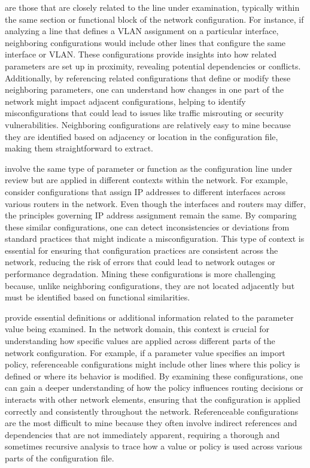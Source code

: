      are those that are closely related to the line under examination, typically within the same section or functional block of the network configuration. For instance, if analyzing a line that defines a VLAN assignment on a particular interface, neighboring configurations would include other lines that configure the same interface or VLAN. These configurations provide insights into how related parameters are set up in proximity, revealing potential dependencies or conflicts. Additionally, by referencing related configurations that define or modify these neighboring parameters, one can understand how changes in one part of the network might impact adjacent configurations, helping to identify misconfigurations that could lead to issues like traffic misrouting or security vulnerabilities. Neighboring configurations are relatively easy to mine because they are identified based on adjacency or location in the configuration file, making them straightforward to extract.
        
     involve the same type of parameter or function as the configuration line under review but are applied in different contexts within the network. For example, consider configurations that assign IP addresses to different interfaces across various routers in the network. Even though the interfaces and routers may differ, the principles governing IP address assignment remain the same. By comparing these similar configurations, one can detect inconsistencies or deviations from standard practices that might indicate a misconfiguration. This type of context is essential for ensuring that configuration practices are consistent across the network, reducing the risk of errors that could lead to network outages or performance degradation. Mining these configurations is more challenging because, unlike neighboring configurations, they are not located adjacently but must be identified based on functional similarities.

    provide essential definitions or additional information related to the parameter value being examined. In the network domain, this context is crucial for understanding how specific values are applied across different parts of the network configuration. For example, if a parameter value specifies an import policy, referenceable configurations might include other lines where this policy is defined or where its behavior is modified. By examining these configurations, one can gain a deeper understanding of how the policy influences routing decisions or interacts with other network elements, ensuring that the configuration is applied correctly and consistently throughout the network.
    Referenceable configurations are the most difficult to mine because they often involve indirect references and dependencies that are not immediately apparent, requiring a thorough and sometimes recursive analysis to trace how a value or policy is used across various parts of the configuration file.


